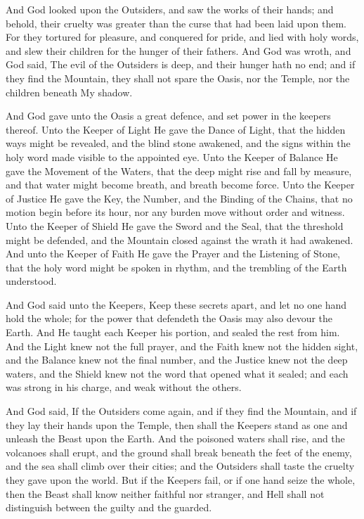 \begin{scripture}
And God looked upon the Outsiders, and saw the works of their hands; and behold, their cruelty was greater than the curse that had been laid upon them.
For they tortured for pleasure, and conquered for pride, and lied with holy words, and slew their children for the hunger of their fathers.
And God was wroth, and God said, The evil of the Outsiders is deep, and their hunger hath no end; and if they find the Mountain, they shall not spare the Oasis, nor the Temple, nor the children beneath My shadow.
\end{scripture}
 
\begin{scripture}
And God gave unto the Oasis a great defence, and set power in the keepers thereof.
Unto the Keeper of Light He gave the Dance of Light, that the hidden ways might be revealed, and the blind stone awakened, and the signs within the holy word made visible to the appointed eye.
Unto the Keeper of Balance He gave the Movement of the Waters, that the deep might rise and fall by measure, and that water might become breath, and breath become force.
Unto the Keeper of Justice He gave the Key, the Number, and the Binding of the Chains, that no motion begin before its hour, nor any burden move without order and witness.
Unto the Keeper of Shield He gave the Sword and the Seal, that the threshold might be defended, and the Mountain closed against the wrath it had awakened.
And unto the Keeper of Faith He gave the Prayer and the Listening of Stone, that the holy word might be spoken in rhythm, and the trembling of the Earth understood.
\end{scripture}
 
\begin{scripture}
And God said unto the Keepers, Keep these secrets apart, and let no one hand hold the whole; for the power that defendeth the Oasis may also devour the Earth.
And He taught each Keeper his portion, and sealed the rest from him.
And the Light knew not the full prayer, and the Faith knew not the hidden sight, and the Balance knew not the final number, and the Justice knew not the deep waters, and the Shield knew not the word that opened what it sealed; and each was strong in his charge, and weak without the others.
\end{scripture}
 
\begin{scripture}
And God said, If the Outsiders come again, and if they find the Mountain, and if they lay their hands upon the Temple, then shall the Keepers stand as one and unleash the Beast upon the Earth.
And the poisoned waters shall rise, and the volcanoes shall erupt, and the ground shall break beneath the feet of the enemy, and the sea shall climb over their cities; and the Outsiders shall taste the cruelty they gave upon the world.
But if the Keepers fail, or if one hand seize the whole, then the Beast shall know neither faithful nor stranger, and Hell shall not distinguish between the guilty and the guarded.
\end{scripture}
 
